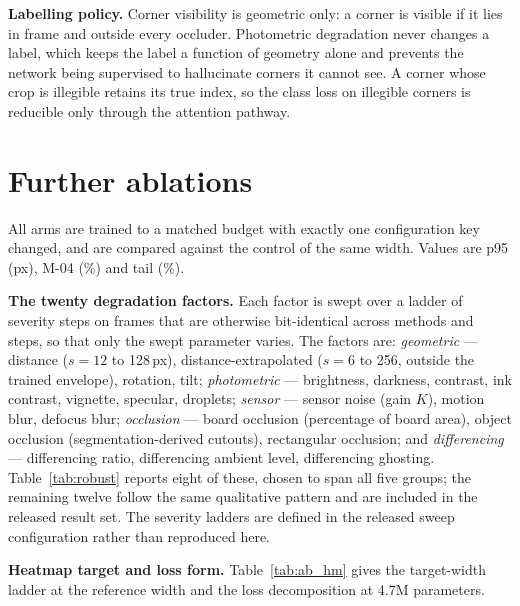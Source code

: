 \documentclass[10pt,twocolumn,letterpaper]{article}
\begin{document}
\textbf{Labelling policy.} Corner visibility is geometric only: a corner is visible if it lies in
frame and outside every occluder. Photometric degradation never changes a label, which keeps the
label a function of geometry alone and prevents the network being supervised to hallucinate corners
it cannot see. A corner whose crop is illegible retains its true index, so the class loss on
illegible corners is reducible only through the attention pathway.

\section{Further ablations}
\label{app:abl}

All arms are trained to a matched budget with exactly one configuration key changed, and are
compared against the control of the same width. Values are p95 (px), M-04 (\%) and tail (\%).

\textbf{The twenty degradation factors.} Each factor is swept over a ladder of severity steps on
frames that are otherwise bit-identical across methods and steps, so that only the swept parameter
varies. The factors are: \emph{geometric} --- distance ($s = 12$ to 128\,px), distance-extrapolated
($s = 6$ to 256, outside the trained envelope), rotation, tilt; \emph{photometric} --- brightness,
darkness, contrast, ink contrast, vignette, specular, droplets; \emph{sensor} --- sensor noise
(gain $K$), motion blur, defocus blur; \emph{occlusion} --- board occlusion (percentage of board
area), object occlusion (segmentation-derived cutouts), rectangular occlusion; and
\emph{differencing} --- differencing ratio, differencing ambient level, differencing ghosting.
Table~\ref{tab:robust} reports eight of these, chosen to span all five groups; the remaining twelve
follow the same qualitative pattern and are included in the released result set. The severity
ladders are defined in the released sweep configuration rather than reproduced here.

\textbf{Heatmap target and loss form.} Table~\ref{tab:ab_hm} gives the target-width ladder at the
reference width and the loss decomposition at 4.7M parameters.
\end{document}
